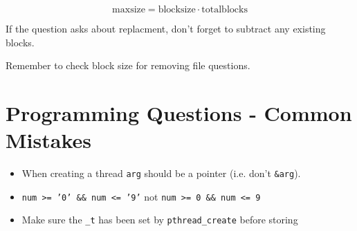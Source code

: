 \documentclass[a4]{article}
\begin{document}
\begin{multicols*}{3}
			
			\[ \text{maxsize} = \text{blocksize} \cdot \text{totalblocks} \] 

			If the question asks about replacment, don't forget to subtract any existing blocks.

			Remember to check block size for removing file questions.
			
			
			
			
		
			\section{Programming Questions - Common Mistakes}
			\label{sec:programming_questions_common_mistakes}
			
				\begin{itemize}
					\item When creating a thread \texttt{arg} should be a pointer (i.e. don't \texttt{&arg}).
					\item \texttt{num >= '0' \&\& num <= '9'} not \texttt{num >= 0 \&\& num <= 9}
					\item Make sure the \texttt{\pthread\_t} has been set by \texttt{pthread\_create} before storing
				\end{itemize}
		
		


		\end{multicols*}	
\end{document}
